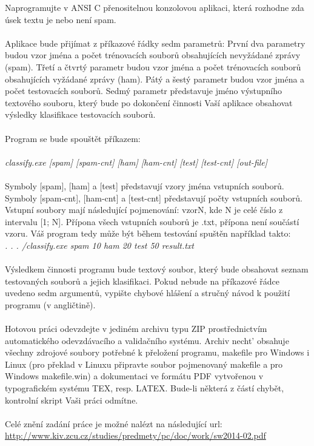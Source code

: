 \documentclass[12pt, a4paper]{report}
\begin{document}
Naprogramujte v ANSI C přenositelnou konzolovou aplikaci, která rozhodne zda úsek textu
je nebo není spam.\\
\\
Aplikace bude přijímat z příkazové řádky sedm parametrů: První dva parametry budou vzor jména a
počet trénovacích souborů obsahujících nevyžádané zprávy (spam).
Třetí a čtvrtý parametr budou vzor jména a počet trénovacích souborů obsahujících vyžádané zprávy
(ham).
Pátý a šestý parametr budou vzor jména a počet testovacích souborů.
Sedmý parametr představuje jméno výstupního textového souboru, který bude po dokončení činnosti
Vaší aplikace obsahovat výsledky klasifikace testovacích souborů.\\
\\
Program se bude spouštět příkazem:\\
\\
{\itshape classify.exe [spam] [spam-cnt] [ham] [ham-cnt] [test] [test-cnt] [out-file]}\\
\\
Symboly [spam], [ham] a [test] představují vzory jména vstupních souborů.\\
Symboly [spam-cnt], [ham-cnt] a [test-cnt] představují počty vstupních souborů.\\
Vstupní soubory mají následující pojmenování:
vzorN, kde N je celé číslo z intervalu [1; N]. Přípona všech vstupních souborů je .txt, přípona
není součástí vzoru. Váš program tedy může být během testování spuštěn například takto:\\
{\itshape. . . /classify.exe spam 10 ham 20 test 50 result.txt}\\
\\
Výsledkem činnosti programu bude textový soubor, který bude obsahovat seznam testovaných souborů
a jejich klasifikaci.
Pokud nebude na příkazové řádce uvedeno sedm argumentů, vypište chybové hlášení a stručný návod
k použití programu (v angličtině).\\
\\
Hotovou práci odevzdejte v jediném archivu typu ZIP prostřednictvím automatického odevzdávacího a
validačního systému. Archiv necht’ obsahuje všechny zdrojové soubory potřebné k přeložení programu,
makefile pro Windows i Linux (pro překlad v Linuxu připravte soubor pojmenovaný makefile a pro
Windows makefile.win) a dokumentaci ve formátu PDF vytvořenou v typografickém systému TEX,
resp. LATEX. Bude-li některá z částí chybět, kontrolní skript Vaši práci odmítne.\\
\\
Celé znění zadání práce je možné nalézt na následující url:\\
\url{http://www.kiv.zcu.cz/studies/predmety/pc/doc/work/sw2014-02.pdf}
\end{document}
